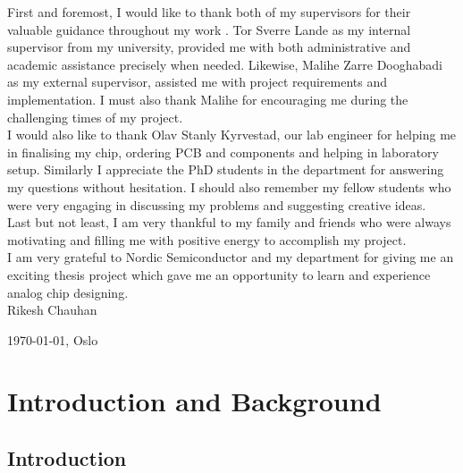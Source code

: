 \documentclass[12pt,a4paper,UKenglish]{report}
\makeatletter
\newcommand\mainmatter{%
    \cleardoublepage
  \pagenumbering{arabic}}
\makeatother
\begin{document}
First and foremost, I would like to thank both of my supervisors for their valuable guidance throughout my work . Tor Sverre Lande as my internal supervisor from my university, provided me with both administrative and academic assistance precisely when needed. Likewise, Malihe Zarre Dooghabadi as my external 
supervisor, assisted me with project requirements and implementation. I must also thank Malihe for encouraging me during the challenging times of my project. \\

I would also like to thank Olav Stanly Kyrvestad, our lab engineer for helping me in finalising my chip, ordering PCB and components and helping in laboratory  setup. 
Similarly I appreciate the PhD students in the department for answering my questions without hesitation. I should also remember my fellow students who were very engaging in discussing my problems and suggesting creative ideas. \\

Last but not least, I am very thankful to my family and friends who were always motivating and filling me with positive energy to accomplish my project.  \\

I am very grateful to Nordic Semiconductor and my department for giving me an exciting thesis project which gave me an opportunity to learn and experience analog chip designing. \\

Rikesh Chauhan

\today, Oslo

\cleardoublepage
{}
\setcounter{tocdepth}{1}
\tableofcontents{}

\cleardoublepage
{}
{}
\listoffigures{}

\cleardoublepage
{}
{}
\listoftables{}
                  
\mainmatter{}


\part{Introduction and Background}

\chapter{Introduction}
\end{document}
